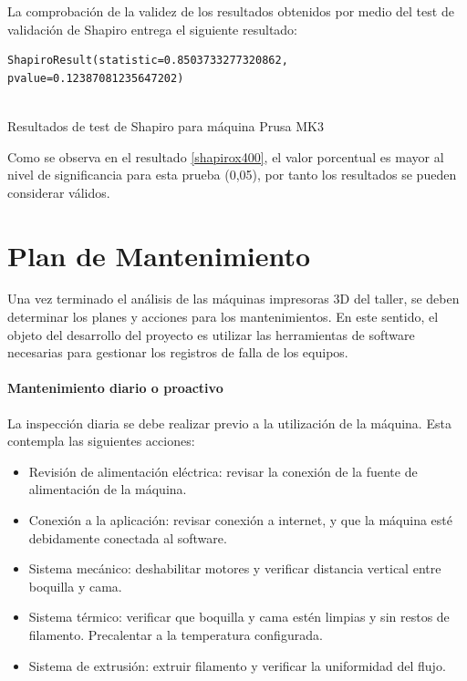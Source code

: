 La comprobación de la validez de los resultados obtenidos por medio del test de validación de Shapiro  entrega el siguiente resultado:


\begin{table}[H]
\begin{lstlisting}
ShapiroResult(statistic=0.8503733277320862, pvalue=0.12387081235647202)


\end{lstlisting}
\caption{Resultados de test de Shapiro para máquina Prusa MK3}
\label{shapiromk3}
\end{table}

Como se observa en el resultado \ref{shapirox400}, el valor porcentual es mayor al nivel de significancia para esta prueba (0,05), por tanto los resultados se pueden considerar válidos.

\section{Plan de Mantenimiento}

Una vez terminado el análisis de las máquinas impresoras 3D del taller, se deben determinar los planes y acciones para los mantenimientos. En este sentido, el objeto del desarrollo del proyecto es utilizar las herramientas de software necesarias para gestionar los registros de falla de los equipos.

\paragraph{Mantenimiento diario o proactivo} La inspección diaria se debe realizar previo a la utilización de la máquina. Esta contempla las siguientes acciones:

\begin{itemize}
\item Revisión de alimentación eléctrica: revisar la conexión de la fuente de alimentación de la máquina.
\item Conexión a la aplicación: revisar conexión a internet, y que la máquina esté debidamente conectada al software.
\item Sistema mecánico: deshabilitar motores y verificar distancia vertical entre boquilla y cama.
\item Sistema térmico: verificar que boquilla y cama estén limpias y sin restos de filamento. Precalentar a la temperatura configurada.
\item Sistema de extrusión: extruir filamento y verificar la uniformidad del flujo.
\end{itemize}

